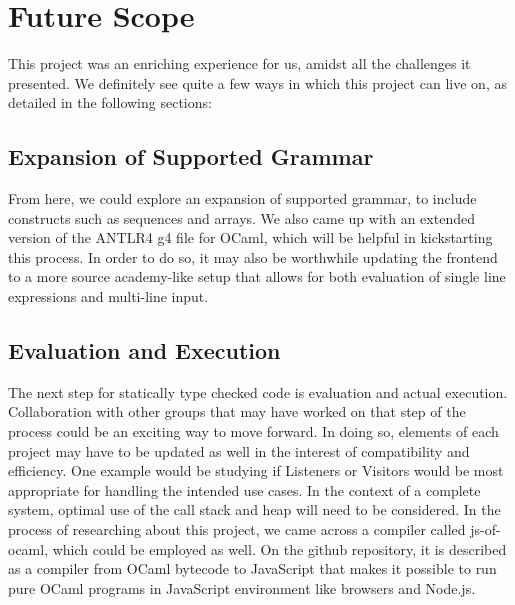 \section{Future Scope}
This project was an enriching experience for us, amidst all the challenges it presented. We definitely see quite a few ways in which this project can live on, as detailed in the following sections:

\subsection{Expansion of Supported Grammar}
From here, we could explore an expansion of supported grammar, to include constructs such as sequences and arrays. We also came up with an extended version of the ANTLR4 g4 file for OCaml, which will be helpful in kickstarting this process. In order to do so, it may also be worthwhile updating the frontend to a more source academy-like setup that allows for both evaluation of single line expressions and multi-line input.
  
\subsection{Evaluation and Execution}
The next step for statically type checked code is evaluation and actual execution. Collaboration with other groups that may have worked on that step of the process could be an exciting way to move forward. In doing so, elements of each project may have to be updated as well in the interest of compatibility and efficiency. One example would be studying if Listeners or Visitors would be most appropriate for handling the intended use cases. In the context of a complete system, optimal use of the call stack and heap will need to be considered. In the process of researching about this project, we came across a compiler called js-of-ocaml, which could be employed as well. On the github repository, it is described as a compiler from OCaml bytecode to JavaScript that makes it possible to run pure OCaml programs in JavaScript environment like browsers and Node.js.
